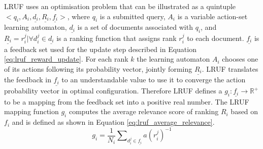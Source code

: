 LRUF uses an optimisation problem that can be illustrated as a quintuple $<q_i,A_i,\underline{d_i},\underline{R_i},\underline{f_i}>$, where $q_i$ is a submitted query, $A_i$ is a variable action-set learning automaton, $\underline{d_i}$ is a set of documents associated with $q_i$, and $\underline{R_i}={r_i^j|\forall d_i^j \in \underline{d_i}}$ is a ranking function that assigns rank $r_i^j$ to each document. $\underline{f_i}$ is a feedback set used for the update step described in Equation \ref{eq:lruf_reward_update}. For each rank $k$ the learning automaton $A_i$ chooses one of its actions following its probability vector, jointly forming $\underline{R_i}$. LRUF translates the feedback in $\underline{f_i}$ to an understandable value to use it to converge the action probability vector in optimal configuration. Therefore LRUF defines a $g_i: \underline{f_i} \rightarrow \mathbb{R}^{+}$ to be a mapping from the feedback set into a positive real number. The LRUF mapping function $g_i$ computes the average relevance score of ranking $R_i$ based on $f_i$ and is defined as shown in Equation \ref{eq:lruf_average_relevance}.
\begin{equation}
g_i=\frac{1}{N_i}\sum\nolimits_{d_{i}^{j}\in \underline{f_i}} a(r_{i}^{j})^{-1}
\label{eq:lruf_average_relevance}
\end{equation}

